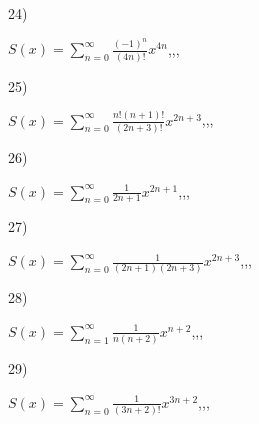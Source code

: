 \documentclass[11pt, ukrainian]{article}
\begin{document}
\par
\vspace{0.9cm}
24) \space 
{%
{$S(x)=\sum\limits_{n=0}^{\infty}{\frac{(-1)^n}{(4n)!}}{x^{{4n}}}$},,, \par \smallskip  
}
\par
\vspace{0.9cm}
25) \space 
{%
{$S(x)=\sum\limits_{n=0}^{\infty}{\frac{n!(n+1)!}{(2n+3)!}}{x^{{2n+3}}}$},,, \par \smallskip  
}
\par
\vspace{0.9cm}
26) \space 
{%
{$S(x)=\sum\limits_{n=0}^{\infty}{\frac{1}{2n+1}}{x^{{2n+1}}}$},,, \par \smallskip  
}
\par
\vspace{0.9cm}
27) \space 
{%
{$S(x)=\sum\limits_{n=0}^{\infty}{\frac{1}{(2n+1)(2n+3)}}{x^{{2n+3}}}$},,, \par \smallskip  
}
\par
\vspace{0.9cm}
28) \space 
{%
{$S(x)=\sum\limits_{n=1}^{\infty}{\frac{1}{n(n+2)}}{x^{{n+2}}}$},,, \par \smallskip  
}
\par
\vspace{0.9cm}
29) \space 
{%
{$S(x)=\sum\limits_{n=0}^{\infty}{\frac{1}{(3n+2)!}}{x^{{3n+2}}}$},,, \par \smallskip  
}
\end{document}
